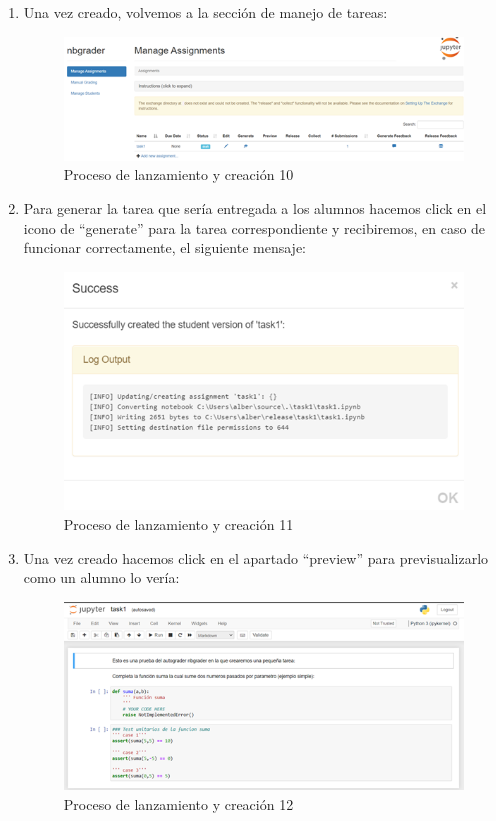 \begin{enumerate}
\item Una vez creado, volvemos a la sección de manejo de tareas:

\begin{figure}[H]
    \centering
    \includegraphics[width=1\textwidth]{img/prueba/prueba_10.png}
    \caption{Proceso de lanzamiento y creación 10}
\end{figure}

\item Para generar la tarea que sería entregada a los alumnos hacemos click en el icono de “generate” para la tarea correspondiente y recibiremos, en caso de funcionar correctamente, el siguiente mensaje:

\begin{figure}[H]
    \centering
    \includegraphics[width=1\textwidth]{img/prueba/prueba_11.png}
    \caption{Proceso de lanzamiento y creación 11}
\end{figure}

\item Una vez creado hacemos click en el apartado “preview” para previsualizarlo como un alumno lo vería:

\begin{figure}[H]
    \centering
    \includegraphics[width=1\textwidth]{img/prueba/prueba_12.png}
    \caption{Proceso de lanzamiento y creación 12}
\end{figure}


\end{enumerate}
